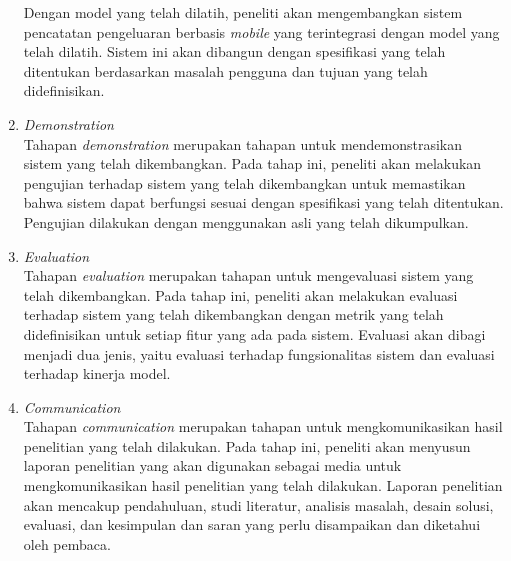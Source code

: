 \begin{enumerate}
		  Dengan model yang telah dilatih, peneliti akan mengembangkan sistem pencatatan pengeluaran berbasis \emph{mobile} yang terintegrasi dengan model \dl{} yang telah dilatih. Sistem ini akan dibangun dengan spesifikasi yang telah ditentukan berdasarkan masalah pengguna dan tujuan yang telah didefinisikan.
	\item \emph{Demonstration}~\\
	      Tahapan \emph{demonstration} merupakan tahapan untuk mendemonstrasikan sistem yang telah dikembangkan. Pada tahap ini, peneliti akan melakukan pengujian terhadap sistem yang telah dikembangkan untuk memastikan bahwa sistem dapat berfungsi sesuai dengan spesifikasi yang telah ditentukan. Pengujian dilakukan dengan menggunakan \dataset{} asli yang telah dikumpulkan.
	\item \emph{Evaluation}~\\
	      Tahapan \emph{evaluation} merupakan tahapan untuk mengevaluasi sistem yang telah dikembangkan. Pada tahap ini, peneliti akan melakukan evaluasi terhadap sistem yang telah dikembangkan dengan metrik yang telah didefinisikan untuk setiap fitur yang ada pada sistem. Evaluasi akan dibagi menjadi dua jenis, yaitu evaluasi terhadap fungsionalitas sistem dan evaluasi terhadap kinerja model.
\item \emph{Communication}~\\
	      Tahapan \emph{communication} merupakan tahapan untuk mengkomunikasikan hasil penelitian yang telah dilakukan. Pada tahap ini, peneliti akan menyusun laporan penelitian yang akan digunakan sebagai media untuk mengkomunikasikan hasil penelitian yang telah dilakukan. Laporan penelitian akan mencakup pendahuluan, studi literatur, analisis masalah, desain solusi, evaluasi, dan kesimpulan dan saran yang perlu disampaikan dan diketahui oleh pembaca.
\end{enumerate}
